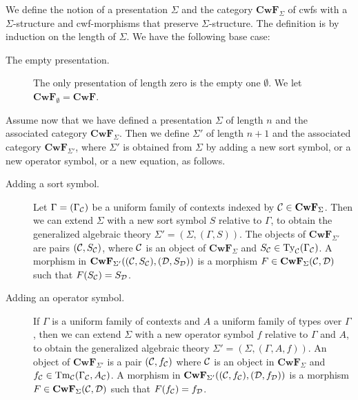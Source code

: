 \documentclass{mscs}
\newcommand{\FYI}[1]{{#1}}
\def\D{\mathcal{D}}
\def\Cwf{\mathbf{CwF}}
\begin{document}
\begin{definition}\label{def-sig-mod}
We define the notion of a \FYI{presentation} $\Sigma$ and the category $\Cwf_\Sigma$ of cwfs with a $\Sigma$-structure and cwf-morphisms that preserve $\Sigma$-structure. The definition is by induction on the length of $\Sigma$. We have the following base case:
\begin{description}
\item[The empty \FYI{presentation}.] The only \FYI{presentation} of length zero is the empty one $\emptyset$. We let $\Cwf_\emptyset = \Cwf$.
\end{description}
Assume now that we have defined a \FYI{presentation} $\Sigma$ of length $n$ and the associated
category $\Cwf_{\Sigma}$.
Then we define $\Sigma'$ of length $n+1$ and the associated category $\Cwf_{\Sigma'}$, where $\Sigma'$ is obtained from $\Sigma$ by adding a new sort symbol, or a new operator symbol, or a new equation, as follows.
\begin{description}
\item[Adding a sort symbol.]
  Let $\Gamma = (\Gamma_{\mathcal C})$ be a uniform family of contexts indexed by $\C \in \Cwf_{\Sigma}$.
  Then we can extend $\Sigma$ with a new sort symbol $S$ relative to $\Gamma$, to obtain
  the generalized algebraic theory $\Sigma' = (\Sigma,(\Gamma,S))$.
  The objects of $\Cwf_{\Sigma'}$ are pairs $({\mathcal C},S_{{\mathcal C}})$, where ${\mathcal C}$ is an object of $\Cwf_{\Sigma}$
  and $S_{{\mathcal C}} \in \mathrm{Ty}_{\mathcal C}(\Gamma_{{\mathcal C}})$.
  A morphism in $\Cwf_{\Sigma'}((\C,S_{\C}), (\D,S_{\D}))$
  is a morphism $F \in \Cwf_{\Sigma}(\C,\D)$ such that $F(S_\C) = S_\D$.
\item[Adding an operator symbol.]
  If $\Gamma$ is a uniform family of contexts and $A$ a uniform family of
  types over $\Gamma$,
  then we can extend $\Sigma$ with a new operator
  symbol $f$ relative to $\Gamma$ and $A$, to obtain
  the generalized algebraic theory $\Sigma' = (\Sigma,(\Gamma,A,f))$.
  An object of $\Cwf_{\Sigma'}$
  is a pair $({\mathcal C},f_{{\mathcal C}})$ where ${\mathcal C}$ is an object in $\Cwf_{\Sigma}$ and $f_{{\mathcal C}} \in \mathrm{Tm}_{\mathcal C}(\Gamma_{\mathcal C},A_{\mathcal C})$.
  A morphism in $\Cwf_{\Sigma'}((\C,f_{\C}),(\D,f_{\D}))$ is a morphism $F \in \Cwf_{\Sigma}(\C,\D)$ such that $F(f_{\C}) = f_{\D}$.

\end{description}
\end{definition}
\end{document}
